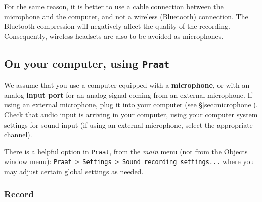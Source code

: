 \documentclass[
]{book}
\begin{document}
For the same reason, it is better to use a cable connection between the microphone and the computer, and not a wireless (Bluetooth) connection. The Bluetooth compression will negatively affect the quality of the recording. Consequently, wireless headsets are also to be avoided as microphones.

\subsection{\texorpdfstring{On your computer, using \texttt{Praat}}{On your computer, using Praat}}\label{on-your-computer-using-praat}

We assume that you use a computer equipped with a \textbf{microphone}, or with an analog \textbf{input port} for an analog signal coming from an external microphone. If using an external microphone, plug it into your computer (see §\ref{sec:microphone}). Check that audio input is arriving in your computer, using your computer system settings for sound input (if using an external microphone, select the appropriate channel).

\protect{}\label{box-praatrecord}
There is a helpful option in \texttt{Praat}, from the \emph{main} menu (not from the Objects window menu): \texttt{Praat\ \textgreater{}\ Settings\ \textgreater{}\ Sound\ recording\ settings...} where you may adjust certain global settings as needed.

\subsubsection{Record}\label{sec:praatrecord}
\end{document}
